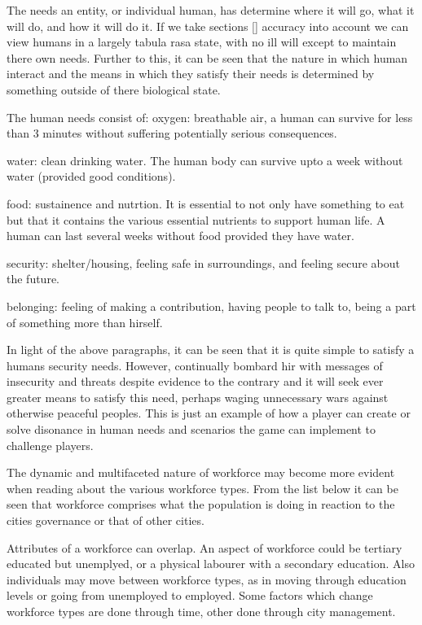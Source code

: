 The needs an entity, or individual human, has determine where it will go, what it will do, and how it will do it. If we take sections [] accuracy into account we can view humans in a largely tabula rasa state, with no ill will except to maintain there own needs. Further to this, it can be seen that the nature in which human interact and the means in which they satisfy their needs is determined by something outside of there biological state. 

The human needs consist of:
oxygen: breathable air, a human can survive for less than 3 minutes without suffering potentially serious consequences. 

water: clean drinking water. The human body can survive upto a week without water (provided good conditions). 

food: sustainence and nutrtion. It is essential to not only have something to eat but that it contains the various essential nutrients to support human life. A human can last several weeks without food provided they have water.

security: shelter/housing, feeling safe in surroundings, and feeling secure about the future.

belonging: feeling of making a contribution, having people to talk to, being a part of something more than hirself.

In light of the above paragraphs, it can be seen that it is quite simple to satisfy a humans security needs. However, continually bombard hir with messages of insecurity and threats despite evidence to the contrary and it will seek ever greater means to satisfy this need, perhaps waging unnecessary wars against otherwise peaceful peoples. This is just an example of how a player can create or solve disonance in human needs and scenarios the game can implement to challenge players.



The dynamic and multifaceted nature of workforce may become more evident when reading about the various workforce types. From the list below it can be seen that workforce comprises what the population is doing in reaction to the cities governance or that of other cities.

Attributes of a workforce can overlap. An aspect of workforce could be tertiary educated but unemplyed, or a physical labourer with a secondary education. Also individuals may move between workforce types, as in moving through education levels or going from unemployed to employed. Some factors which change workforce types are done through time, other done through city management.

